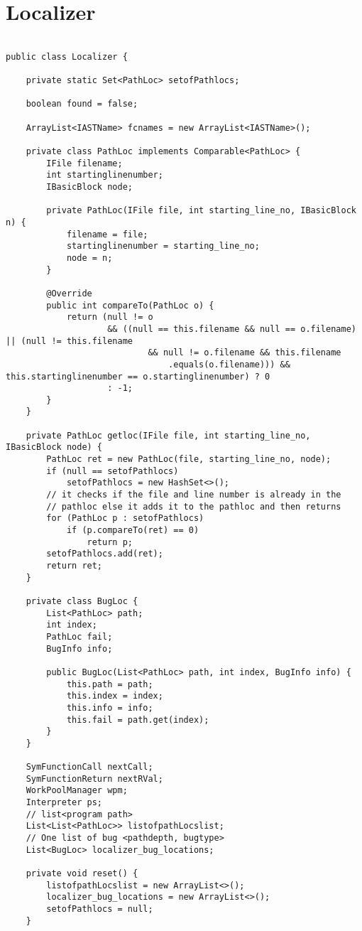 \chapter{Localizer}
\begin{lstlisting}[caption={Localizer},label={lst:Localizer}]

public class Localizer {

	private static Set<PathLoc> setofPathlocs;

	boolean found = false;

	ArrayList<IASTName> fcnames = new ArrayList<IASTName>();

	private class PathLoc implements Comparable<PathLoc> {
		IFile filename;
		int startinglinenumber;
		IBasicBlock node;

		private PathLoc(IFile file, int starting_line_no, IBasicBlock n) {
			filename = file;
			startinglinenumber = starting_line_no;
			node = n;
		}

		@Override
		public int compareTo(PathLoc o) {
			return (null != o
					&& ((null == this.filename && null == o.filename) || (null != this.filename
							&& null != o.filename && this.filename
								.equals(o.filename))) && this.startinglinenumber == o.startinglinenumber) ? 0
					: -1;
		}
	}

	private PathLoc getloc(IFile file, int starting_line_no, IBasicBlock node) {
		PathLoc ret = new PathLoc(file, starting_line_no, node);
		if (null == setofPathlocs)
			setofPathlocs = new HashSet<>();
		// it checks if the file and line number is already in the
		// pathloc else it adds it to the pathloc and then returns
		for (PathLoc p : setofPathlocs)
			if (p.compareTo(ret) == 0)
				return p;
		setofPathlocs.add(ret);
		return ret;
	}

	private class BugLoc {
		List<PathLoc> path;
		int index;
		PathLoc fail;
		BugInfo info;

		public BugLoc(List<PathLoc> path, int index, BugInfo info) {
			this.path = path;
			this.index = index;
			this.info = info;
			this.fail = path.get(index);
		}
	}

	SymFunctionCall nextCall;
	SymFunctionReturn nextRVal;
	WorkPoolManager wpm;
	Interpreter ps;
	// list<program path>
	List<List<PathLoc>> listofpathLocslist;
	// One list of bug <pathdepth, bugtype>
	List<BugLoc> localizer_bug_locations;

	private void reset() {
		listofpathLocslist = new ArrayList<>();
		localizer_bug_locations = new ArrayList<>();
		setofPathlocs = null;
	}


\end{lstlisting}
